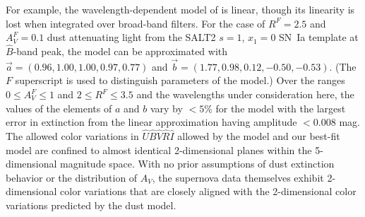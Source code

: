 \documentclass[trackchanges]{aastex61}   	%
\begin{document}
For example,   the wavelength-dependent model of  \citet{1989ApJ...345..245C} is linear,
though its linearity is lost when integrated over broad-band filters.
For the case of
$R^F=2.5$ and $A^F_V=0.1$ dust attenuating light from the SALT2
\citep{2007A&A...466...11G} $s=1$, $x_1=0$ SN~Ia template at ${\hat{B}}$-band peak, the 
 model
can be approximated with
$\vec{a} = (0.96,   1.00,   1.00,   0.97,   0.77)$ and $\vec{b}=(  1.77,   0.98,   0.12,  -0.50,  -0.53)$.
(The $F$ superscript is used to distinguish parameters of the  model.)
Over the ranges
 $0\le A^F_V\le 1$ and $2 \le R^F \le 3.5$ 
and the wavelengths under consideration here,  the values of the elements of $a$ and $b$ vary by $<5$\%
for the
 model with
 the largest error in extinction from the linear approximation having amplitude $<0.008$ mag.
The allowed color
variations in ${\hat{U}}{\hat{B}}{\hat{V}}{\hat{R}}{\hat{I}}$ allowed by the  model and our best-fit model are confined to almost identical
2-dimensional
planes within
the 5-dimensional magnitude space.
With no prior assumptions of dust extinction behavior or the distribution of $A_V$, the supernova data themselves exhibit
2-dimensional color variations that are closely aligned with the 2-dimensional color variations predicted by the  dust model.
\end{document}
